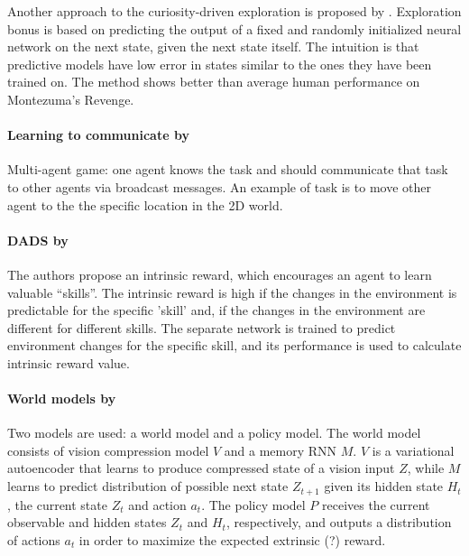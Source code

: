 \documentclass[acmsmall, nonacm]{acmart}
\begin{document}
Another approach to the curiosity-driven exploration is proposed by \citep{burda_exploration_2019}. Exploration bonus is based on predicting the output of a fixed and randomly initialized neural network on the next state, given the next state itself. The intuition is that predictive models have low error in states similar to the ones they have been trained on. The method shows better than average human performance on Montezuma’s Revenge.


\paragraph{Learning to communicate by~\citet{Mordatch2018EmergenceOG}} %
\label{par:learning_tom_communicate}

Multi-agent game: one agent knows the task and should communicate that task to other agents via broadcast messages. An example of task is to move other agent to the the specific location in the 2D world.


\paragraph{DADS by~\citet{Sharma2020DynamicsAwareUD}} %
\label{par:dads}

The authors propose an intrinsic reward, which encourages an agent to learn valuable ``skills''. The intrinsic reward is high if the changes in the environment is predictable for the specific 'skill' and, if the changes in the environment are different for different skills. The separate network is trained to predict environment changes for the specific skill, and its performance is used to calculate intrinsic reward value.


\paragraph{World models by~\citet{ha_recurrent_2018}} %
\label{par:world_models}

Two models are used: a world model and a policy model. The world model consists of vision compression model $V$ and a memory RNN $M$. $V$ is a variational autoencoder that learns to produce compressed state of a vision input $Z$, while $M$ learns to predict distribution of possible next state $Z_{t+1}$ given its hidden state $H_t$, the current state $Z_t$ and action $a_t$. The policy model $P$ receives the current observable and hidden states $Z_t$ and $H_t$, respectively, and outputs a distribution of actions $a_t$ in order to maximize the expected extrinsic (?) reward.
\end{document}
